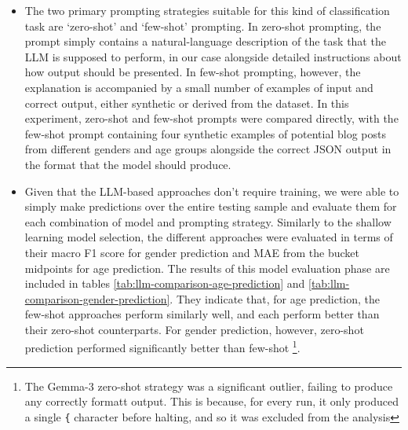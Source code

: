 \documentclass{report}
\begin{document}
\begin{itemize}
\begin{enumerate}
\item \textbf{Mistral 7B Instruct}

This is an open-source 7 billion parameter model from Mistral, which is fine-tuned for instruction following. Mistral 7B often outperforms Llama-2 7B in benchmarks , and has the added benefit of high-performance under quantisation  , meaning that it could have an even greater capacity for parallelisation.

\item \textbf{Gemma 3 4B Instruct}

This is a 7 billion parameter model from Google's Gemma family, a collection of smaller open-source LLMs. Although this model is smaller than the other two, it has performed competitively in benchmarks 
\end{enumerate}

\item The two primary prompting strategies suitable for this kind of classification task are `zero-shot' and `few-shot' prompting. In zero-shot prompting, the prompt simply contains a natural-language description of the task that the LLM is supposed to perform, in our case alongside detailed instructions about how output should be presented. In few-shot prompting, however, the explanation is accompanied by a small number of examples of input and correct output, either synthetic or derived from the dataset. In this experiment, zero-shot and few-shot prompts were compared directly, with the few-shot prompt containing four synthetic examples of potential blog posts from different genders and age groups alongside the correct JSON output in the format that the model should produce.

\item Given that the LLM-based approaches don't require training, we were able to simply make predictions over the entire testing sample and evaluate them for each combination of model and prompting strategy. Similarly to the shallow learning model selection, the different approaches were evaluated in terms of their macro F1 score for gender prediction and MAE from the bucket midpoints for age prediction. The results of this model evaluation phase are included in tables \ref{tab:llm-comparison-age-prediction} and \ref{tab:llm-comparison-gender-prediction}. They indicate that, for age prediction, the few-shot approaches perform similarly well, and each perform better than their zero-shot counterparts. For gender prediction, however, zero-shot prediction performed significantly better than few-shot \footnote{The Gemma-3 zero-shot strategy was a significant outlier, failing to produce any correctly formatt output. This is because, for every run, it only produced a single \texttt{\{} character before halting, and so it was excluded from the analysis}.


\end{itemize}
\end{document}
